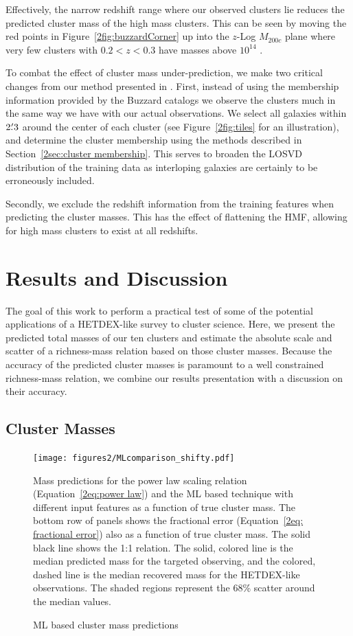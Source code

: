 Effectively, the narrow redshift range where our observed clusters lie reduces the predicted cluster mass of the high mass clusters. This can be seen by moving the red points in Figure~\ref{2fig:buzzardCorner} up into the $z$-Log $M_{200c}$ plane where very few clusters with $0.2< z <0.3$ have masses above $10^{14}$ \Msol.

To combat the effect of cluster mass under-prediction, we make two critical changes from our method presented in . First, instead of using the membership information provided by the Buzzard catalogs we observe the clusters much in the same way we have with our actual observations. We select all galaxies within $2\mbox{\ensuremath{.\mkern-4mu^\prime}}3$ around the center of each cluster (see Figure~\ref{2fig:tiles} for an illustration), and determine the cluster membership using the methods described in Section~\ref{2sec:cluster membership}. This serves to broaden the LOSVD distribution of the training data as interloping galaxies are certainly to be erroneously included.

Secondly, we exclude the redshift information from the training features when predicting the cluster masses. This has the effect of flattening the HMF, allowing for high mass clusters to exist at all redshifts. 

\section{Results and Discussion}\label{2sec:results}
The goal of this work to perform a practical test of some of the potential applications of a HETDEX-like survey to cluster science. Here, we present the predicted total masses of our ten clusters and estimate the absolute scale and scatter of a richness-mass relation based on those cluster masses. Because the accuracy of the predicted cluster masses is paramount to a well constrained richness-mass relation, we combine our results presentation with a discussion on their accuracy. 
 
\subsection{Cluster Masses}
\begin{figure}
	\centering 
	\texttt{[image: figures2/MLcomparison\_shifty.pdf]}
	\caption{ML based cluster mass predictions} 
	Mass predictions for the power law scaling relation (Equation~\ref{2eq:power law}) and the ML based technique with different input features as a function of true cluster mass. The bottom row of panels shows the fractional error (Equation~\ref{2eq: fractional error}) also as a function of true cluster mass. The solid black line shows the 1:1 relation. The solid, colored line is the median predicted mass for the targeted observing, and the colored, dashed line is the median recovered mass for the HETDEX-like observations. The shaded regions represent the 68\% scatter around the median values. \label{2fig: ML comparison} 
\end{figure}

